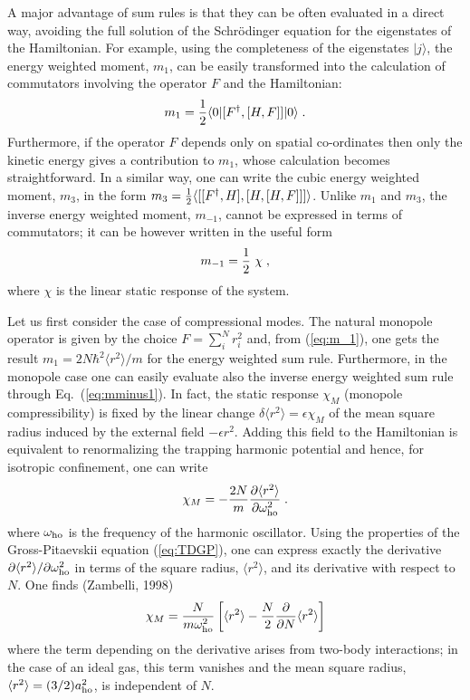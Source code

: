A major advantage of sum rules is that they can be often evaluated in 
a direct way, avoiding the full solution of the Schr\"odinger equation 
for the eigenstates of the Hamiltonian. For example, using the 
completeness of the eigenstates $|j \rangle$, the  energy weighted 
moment, $m_1$, can be easily transformed into the calculation of 
commutators involving the operator $F$ and the Hamiltonian:
\begin{equation}
m_1 = {1\over 2}  \langle 0 | [F^{\dagger},[H,F] ] | 0 \rangle  \; .
\label{eq:m_1}
\end{equation}
Furthermore, if the operator $F$ depends only on spatial co-ordinates
then only the kinetic energy  gives a contribution to $m_1$, whose 
calculation becomes straightforward. In a similar way, one can write 
the cubic energy weighted moment, $m_3$, in the form $m_3={1\over 2} 
\langle [[F^{\dagger},H],[H,[H,F]]] \rangle$. Unlike $m_1$ and $m_3$,
the inverse energy weighted moment, $m_{-1}$, cannot be expressed in 
terms of commutators; it can be however written in the useful form
\begin{equation}
m_{-1}= {1\over 2}\ \chi \; ,
\label{eq:mminus1}
\end{equation}
where $\chi$ is the linear static response of the system. 

Let us first consider the case of compressional modes. The natural 
monopole operator is given by the choice $F=\sum_i^Nr^2_i$ and, from 
(\ref{eq:m_1}), one gets the result $m_1= 2N \hbar^2 \langle r^2 
\rangle/m$ for the energy weighted sum rule.  Furthermore, in the 
monopole case one can easily evaluate also the inverse energy weighted
sum rule through Eq.~(\ref{eq:mminus1}). In fact, the static response
$\chi_M$ (monopole compressibility) is fixed by the linear change 
$\delta\langle r^2\rangle = \epsilon \chi_M$ of the mean square radius 
induced by the external field $-\epsilon r^2$. Adding this field to 
the Hamiltonian is equivalent to renormalizing the trapping harmonic 
potential and hence, for isotropic confinement, one can write
\begin{equation}
\chi_M = -{2N\over m} {\partial \langle r^2 \rangle \over
\partial \omega_{\rm ho}^2} \; .
\label{eq:chim}
\end{equation}
where $\omega_{\rm ho}$ is the frequency of the harmonic oscillator.
Using the properties of  the Gross-Pitaevskii equation
(\ref{eq:TDGP}), one can express exactly the derivative $\partial 
\langle r^2 \rangle / \partial \omega_{\rm ho}^2$ in terms of the square 
radius, $\langle r^2 \rangle$,  and its derivative with respect to $N$.
One finds (Zambelli, 1998)
\begin{equation}
\chi_M =  { N \over m \omega_{\rm ho}^2} \left[ \langle r^2 \rangle
- {N \over 2} {\partial \over \partial N} \langle r^2 \rangle \right]
\label{eq:chiexplicit}
\end{equation}
where the term depending on the derivative arises from two-body
interactions; in the case of an ideal gas, this term vanishes and 
the mean square radius, $\langle r^2 \rangle = 
(3/2) a^2_{\rm ho}$, is independent of $N$.

